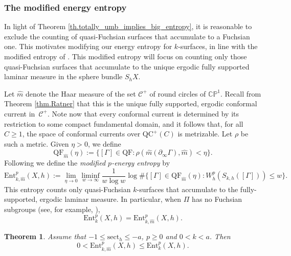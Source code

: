 \documentclass[10pt]{amsart}
\newcommand{\ksurfaces}{$k$\nobreakdash-surfaces\xspace}
\theoremstyle{plain}
\newtheorem{theorem}{Theorem}[section]
\theoremstyle{definition}
\newcommand{\C}{{\mathbb C}}
\newcommand{\PP}{{\mathbb P}}
\newcommand{\cC}{{\mathcal C}}
\newcommand{\sect}{\mathrm{sect}}
\newcommand{\Ent}{\mathrm{Ent}}
\newcommand{\QF}{\mathrm{QF}}
\newcommand{\QC}{\mathrm{QC}}
\newcommand{\bord}{\partial_{\infty}}
\begin{document}
\subsubsection{The modified energy entropy}\label{sss.Modified_entropy}
In light of Theorem \ref{th.totally_umb_implies_big_entropy}, it is reasonable to exclude the counting of quasi-Fuchsian surfaces that accumulate to a Fuchsian one. This motivates modifying our energy entropy for \ksurfaces, in line with the modified entropy of \cite{MN_currents}. This modified entropy will focus on counting only those quasi-Fuchsian surfaces that accumulate to the unique ergodic fully supported laminar measure in the sphere bundle $S_hX$.

Let $\hat m$ denote the Haar measure of the set $\cC^+$ of round circles of $\C\PP^1$. Recall from Theorem \ref{thm.Ratner} that this is the unique fully supported, ergodic conformal current in~$\cC^+$. Note now that every conformal current is determined by its restriction to some compact fundamental domain, and it follows that, for all $C\geq 1$, the space of conformal currents over $\QC^+(C)$ is metrizable. Let $\rho$ be such a metric. Given $\eta>0$, we define
\begin{equation*}
\QF_{\hat m}(\eta):=\bigl\{[\Gamma]\in\QF:\rho(\hat m(\bord\Gamma),\hat m)<\eta\bigr\}.
\end{equation*}
Following \cite{MN_currents} we define the \emph{modified $p$-energy entropy} by
\begin{equation*}
\Ent^p_{k,\hat m}(X,h):=\lim_{\eta\to 0}\liminf_{w\to\infty}\frac{1}{w\log w}\log\#\bigl\{[\Gamma]\in\QF_{\hat m}(\eta):W^{p}_{h}(S_{k,h}([\Gamma]))\leq w\bigr\}.
\end{equation*}
This entropy counts only quasi-Fuchsian \ksurfaces that accumulate to the fully-supported, ergodic laminar measure. In particular, when $\Pi$ has no Fuchsian subgroups (see, for example, \cite[\S 5.3]{MR03}),
\begin{equation*}
\Ent^{p}_{k}(X,h)=\Ent^{p}_{k,\hat m}(X,h).
\end{equation*}

\begin{theorem}
Assume that $-1\leq\sect_h\leq-a$, $p\geq 0$ and $0<k<a$. Then
\begin{equation*}
0<\Ent^{p}_{k,\hat m}(X,h)\leq\Ent^{p}_{k}(X,h).
\end{equation*}
\end{theorem}
\end{document}
